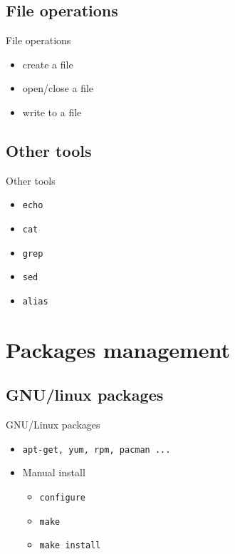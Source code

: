 \documentclass{beamer}
\begin{document}
  \subsection{File operations}
  \begin{frame}{File operations}
    \begin{itemize}
      \item create a file
        \pause
      \item open/close a file
        \pause
      \item write to a file
        \pause
    \end{itemize}
  \end{frame}

  \subsection{Other tools}
  \begin{frame}{Other tools}
      \begin{itemize}
        \item {\tt echo}
          \pause
        \item {\tt cat}
          \pause
        \item {\tt grep}
          \pause
        \item {\tt sed}
          \pause
        \item {\tt alias} 
      \end{itemize}
  \end{frame}

  \section{Packages management}
  \subsection{GNU/linux packages}
  \begin{frame}{GNU/Linux packages}
    \begin{block}{}
      \begin{itemize}
        \item {\tt apt-get, yum, rpm, pacman ...}
          \pause
        \item {Manual install}
          \pause
                \begin{itemize}
                \item {\tt configure}
                \item {\tt make}
                \item {\tt make install}
                \end{itemize}
      \end{itemize}
    \end{block}
    \end{frame}
\end{document}
